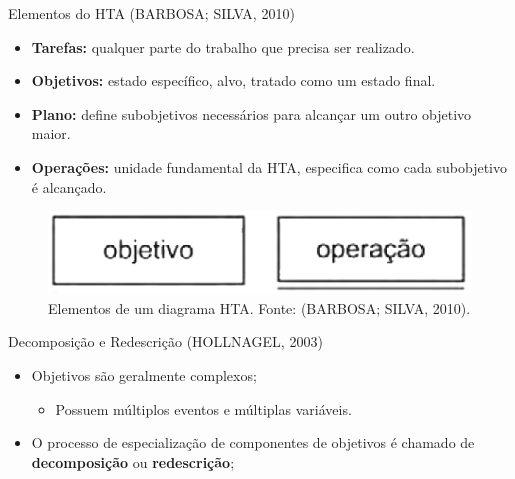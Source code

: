 \documentclass[xcolor=dvipsnames]{beamer}
\let\olditem=\item%
\renewcommand{\item}{\olditem \justifying}%
\begin{document}
\begin{frame}{Elementos do HTA  (BARBOSA; SILVA, 2010)}

	\begin{itemize}
    
    	\item \textbf{Tarefas:} qualquer parte do trabalho que precisa ser realizado.
        
        \bigskip
        
		\item \textbf{Objetivos:} estado específico, alvo, tratado como um estado final.
        
        \bigskip
        
        \item \textbf{Plano:} define subobjetivos necessários para alcançar um outro objetivo maior.
        
        \bigskip
        
        \item \textbf{Operações:} unidade fundamental da HTA, especifica como cada subobjetivo é alcançado.
        
    \end{itemize}
    
      	\begin{figure}[H]
    	\centering
        \includegraphics[width=0.75\linewidth]{img/elementos.png}
        \caption{Elementos de um diagrama HTA. Fonte: (BARBOSA; SILVA, 2010).}

    \end{figure}
    
\end{frame}



\begin{frame}{Decomposição e Redescrição  (HOLLNAGEL, 2003)}

	\begin{itemize}
    
    	\item Objetivos são geralmente complexos;
        
        
        \begin{itemize}
        
			\item Possuem múltiplos eventos e múltiplas variáveis.
            
		\end{itemize}
        
        \bigskip
        
    	\item O processo de especialização de componentes de objetivos é chamado de \textbf{decomposição} ou \textbf{redescrição};
        
        
    \end{itemize}
    
\end{frame}
\end{document}
